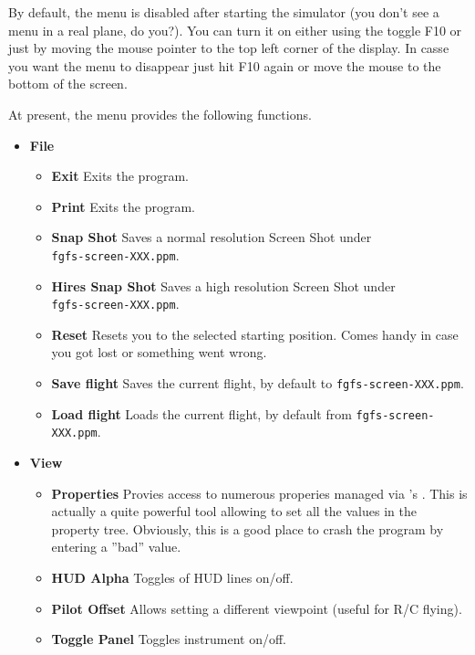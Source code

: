 By default, the menu is disabled after starting the simulator (you don't see a menu in a real plane, do you?). You can turn it on either using the toggle F10 or just by moving the mouse pointer to the top left corner of the display. In casse you want the menu to disappear just hit F10 again or move the mouse to the bottom of the screen.

At present, the menu provides the following functions.

\begin{itemize}
 \item \textbf{File}
 \begin{itemize}
 \item \textbf{Exit} Exits the program.
 \item \textbf{Print} Exits the program.
 \item \textbf{Snap Shot} Saves a normal resolution Screen Shot under\\  \texttt{fgfs-screen-XXX.ppm}.
 \item \textbf{Hires Snap Shot} Saves a high resolution Screen Shot under\\ \texttt{fgfs-screen-XXX.ppm}.
 \item \textbf{Reset} Resets you to the selected starting position. Comes handy in case you got
lost or something went wrong.
\item \textbf{Save flight} Saves the current flight, by default to \texttt{fgfs-screen-XXX.ppm}.
 \item \textbf{Load flight} Loads the current flight, by default from \texttt{fgfs-screen-XXX.ppm}.
  \end{itemize}

 \item \textbf{View}
 \begin{itemize}
 \item \textbf{Properties} Provies access to numerous properies managed via \FlightGear{}'s . This is actually a quite powerful tool allowing to set all the values in the property tree. Obviously, this is a good place to crash the program by entering a ''bad'' value.
 \item \textbf{HUD Alpha} Toggles  of HUD lines on/off.
 \item \textbf{Pilot Offset} Allows setting a different viewpoint (useful for R/C flying). 
 \item \textbf{Toggle Panel} Toggles instrument  on/off. 
 \end{itemize}
 

\end{itemize}
